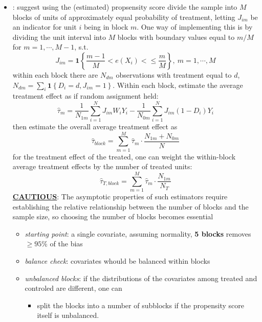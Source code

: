 \documentclass[twoside]{article}
\begin{document}
\begin{itemize}
    \item {}: \citet{rosenbaum1983central} suggest using the (estimated) propsensity score divide the sample into $M$ blocks of units of approximately equal probability of treatment, letting $J_{im}$ be an indicator for unit $i$ being in block $m$. One way of implementing this is by dividing the unit interval into $M$ blocks with boundary values equal to $m/M$ for $m=1,\cdots,M-1$, s.t. 
    \begin{equation*}
        J_{im} = \mathbf{1} \left\{ \frac{m-1}{M} < e(X_i) < \leq \frac{m}{M} \right\},\ m=1,\cdots,M 
    \end{equation*}
    within each block there are $N_{dm}$ observations with treatment equal to $d$, $N_{dm}=\sum_i \mathbf{1}\left\{D_i=d, J_{im}=1\right\}$. Within each block, estimate the average treatment effect as if random assignment held:
    \begin{equation*}
        \hat{\tau}_m = \frac{1}{N_{1m}} \sum^N_{i=1} J_{im}W_iY_i - \frac{1}{N_{0m}}\sum^N_{i=1} J_{im}\left(1-D_i\right)Y_i
    \end{equation*}
    then estimate the overall average treatment effect as 
    \begin{equation*}
        \hat{\tau}_{block} = \sum^M_{m=1}\hat{\tau}_m \cdot \frac{N_{1m}+N_{0m}}{N}
    \end{equation*}
    for the treatment effect of the treated, one can weight the within-block average treatment effects by the number of treated units: 
    \begin{equation*}
        \hat{\tau}_{T,block} = \sum^M_{m=1} \hat{\tau}_m \cdot \frac{N_{1m}}{N_T}
    \end{equation*}
    \underline{\textbf{CAUTIOUS}}: The asymptotic properties of such estimators require establishing the relative relationship between the number of blocks and the sample size, so choosing the number of blocks becomes essential 
    \begin{itemize}
        \item \textit{starting point}: a single covariate, assuming normality, \textbf{5 blocks} removes $\geq 95\%$ of the bias
        \item \textit{balance check}: covariates whould be balanced within blocks 
        \item \textit{unbalanced blocks}: if the distributions of the covariates among treated and controled are different, one can 
        \begin{itemize}
            \item split the blocks into a number of subblocks if the propensity score itself is unbalanced.

\end{itemize}
\end{itemize}
\end{itemize}
\end{document}

